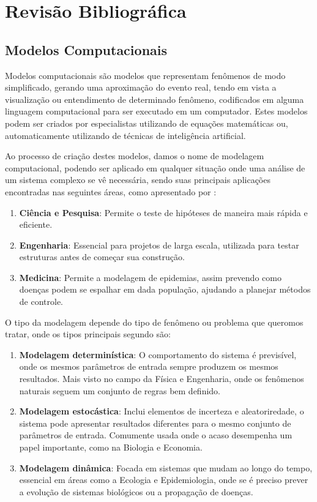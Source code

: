 \documentclass[
	12pt,				%
	openright,			%
	oneside,			%
	a4paper,			%
	english,			%
	brazil				%
	]{abntex2}
\begin{document}
\chapter{Revisão Bibliográfica}

\section{Modelos Computacionais}

Modelos computacionais são modelos que representam fenômenos de modo simplificado, gerando uma aproximação
do evento real, tendo em vista a visualização ou entendimento de determinado fenômeno, codificados em 
alguma linguagem computacional para ser executado em um computador. Estes modelos podem ser criados
por especialistas utilizando de equações matemáticas ou, automaticamente utilizando de técnicas de
inteligência artificial. \cite{modelos_computacionais}

Ao processo de criação destes modelos, damos o nome de modelagem computacional, podendo ser aplicado em
qualquer situação onde uma análise de um sistema complexo se vê necessária, sendo suas principais
aplicações encontradas nas seguintes áreas, como apresentado por \cite{modelagem_computacional}:

\begin{enumerate}
	\item \textbf{Ciência e Pesquisa}: Permite o teste de hipóteses de maneira mais rápida e eficiente.
	\item \textbf{Engenharia}: Essencial para projetos de larga escala, utilizada para testar estruturas antes de
	começar sua construção.
	\item \textbf{Medicina}: Permite a modelagem de epidemias, assim prevendo como doenças podem se espalhar em dada
	população, ajudando a planejar métodos de controle.
\end{enumerate}

O tipo da modelagem depende do tipo de fenômeno ou problema que queromos tratar, onde os tipos principais
segundo \cite{modelagem_computacional} são:

\begin{enumerate}
	\item \textbf{Modelagem determinística}: O comportamento do sistema é previsível, onde os mesmos parâmetros de 
	entrada sempre produzem os mesmos resultados. Mais visto no campo da Física e Engenharia, onde os 
	fenômenos naturais seguem um conjunto de regras bem definido.
	\item \textbf{Modelagem estocástica}: Inclui elementos de incerteza e aleatoriredade, o sistema pode apresentar
	resultados diferentes para o mesmo conjunto de parâmetros de entrada. Comumente usada onde o acaso 
	desempenha um papel importante, como na Biologia e Economia.
	\item \textbf{Modelagem dinâmica}: Focada em sistemas que mudam ao longo do tempo, essencial em áreas como a
	Ecologia e Epidemiologia, onde se é preciso prever a evolução de sistemas biológicos ou a propagação
	de doenças. 
\end{enumerate}
\end{document}
